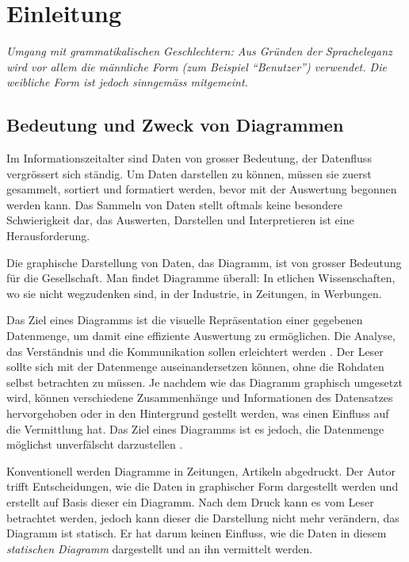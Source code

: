 \chapter{Einleitung}

\textit{Umgang mit grammatikalischen Geschlechtern: Aus Gründen der Spracheleganz wird vor allem die männliche Form (zum Beispiel "`Benutzer"') verwendet. Die weibliche Form ist jedoch sinngemäss mitgemeint.}

\section{Bedeutung  und Zweck von Diagrammen}

Im Informationszeitalter sind Daten von grosser Bedeutung, der Datenfluss vergrössert sich ständig. Um Daten darstellen zu können, müssen sie zuerst gesammelt, sortiert und formatiert werden, bevor mit der Auswertung begonnen werden kann. Das Sammeln von Daten stellt oftmals keine besondere Schwierigkeit dar, das Auswerten, Darstellen und Interpretieren ist eine Herausforderung.

Die graphische Darstellung von Daten, das Diagramm, ist von grosser Bedeutung für die Gesellschaft. Man findet Diagramme überall: In etlichen Wissenschaften, wo sie nicht wegzudenken sind, in der Industrie, in Zeitungen, in Werbungen.


Das Ziel eines Diagramms ist die visuelle Repräsentation einer gegebenen Datenmenge, um damit eine effiziente Auswertung zu ermöglichen. Die Analyse, das Verständnis und die Kommunikation sollen erleichtert werden \cite[Kapitel 1.1]{viz}. Der Leser sollte sich mit der Datenmenge auseinandersetzen können, ohne die Rohdaten selbst betrachten zu müssen. Je nachdem wie das Diagramm graphisch umgesetzt wird, können verschiedene Zusammenhänge und Informationen des Datensatzes hervorgehoben oder in den Hintergrund gestellt werden, was einen Einfluss auf die Vermittlung hat. 
Das Ziel eines Diagramms ist es jedoch, die Datenmenge möglichst unverfälscht darzustellen \cite[Kapitel 1.1]{viz}. 




Konventionell werden Diagramme in Zeitungen, Artikeln abgedruckt. Der Autor trifft Entscheidungen, wie die Daten in graphischer Form dargestellt werden und erstellt auf Basis dieser ein Diagramm. Nach dem Druck kann es vom Leser betrachtet werden, jedoch kann dieser die Darstellung nicht mehr verändern, das Diagramm ist statisch. Er hat darum keinen Einfluss, wie die Daten in diesem \textit{statischen Diagramm} dargestellt und an ihn vermittelt werden.

